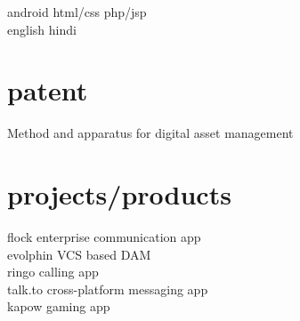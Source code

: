 \begin{minipage}[t]{0.30\textwidth}
android \textbullet{} html/css \textbullet{} php/jsp \\
english \textbullet{} hindi\\ 

\sectionspace %


\section{patent}
Method and apparatus for digital asset management \href{https://patents.google.com/patent/US8868506B1/en?inventor=Kunjan+Aggarwal}{\faChain}
\sectionspace %


\section{projects/products}
flock enterprise communication app \href{https://flock.com}{\faChain} \\
evolphin VCS based DAM \href{https://evolphin.com/}{\faChain} \\
ringo calling app \href{https://www.ringo.co/}{\faChain}\\
talk.to cross-platform messaging app \\
kapow gaming app \\

\end{minipage} %
\hspace{.01\textwidth}
%
%
